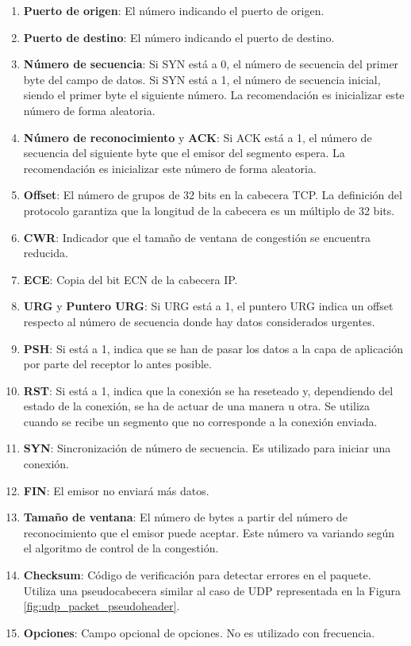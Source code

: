 \begin{enumerate}
    \item \textbf{Puerto de origen}: El número indicando el puerto de origen.
    \item \textbf{Puerto de destino}:  El número indicando el puerto de destino.
    \item \textbf{Número de secuencia}: Si SYN está a 0, el número de secuencia del primer byte del campo de datos. Si SYN está a 1, el número de secuencia inicial, siendo el primer byte el siguiente número. La recomendación es inicializar este número de forma aleatoria.
    \item \textbf{Número de reconocimiento} y \textbf{ACK}: Si ACK está a 1, el número de secuencia del siguiente byte que el emisor del segmento espera.  La recomendación es inicializar este número de forma aleatoria.
    \item \textbf{Offset}: El número de grupos de 32 bits en la cabecera TCP. La definición del protocolo garantiza que la longitud de la cabecera es un múltiplo de 32 bits.
    \item \textbf{CWR}: Indicador que el tamaño de ventana de congestión se encuentra reducida.
    \item \textbf{ECE}: Copia del bit ECN de la cabecera IP.
    \item \textbf{URG} y \textbf{Puntero URG}: Si URG está a 1, el puntero URG indica un offset respecto al número de secuencia donde hay datos considerados urgentes.
    \item \textbf{PSH}: Si está a 1, indica que se han de pasar los datos a la capa de aplicación por parte del receptor lo antes posible.
    \item \textbf{RST}: Si está a 1, indica que la conexión se ha reseteado y, dependiendo del estado de la conexión, se ha de actuar de una manera u otra. Se utiliza cuando se recibe un segmento que no corresponde a la conexión enviada.
    \item \textbf{SYN}: Sincronización de número de secuencia. Es utilizado para iniciar una conexión.
    \item \textbf{FIN}: El emisor no enviará más datos. 
    \item \textbf{Tamaño de ventana}: El número de bytes a partir del número de reconocimiento que el emisor puede aceptar. Este número va variando según el algoritmo de control de la congestión.
    \item \textbf{Checksum}: Código de verificación para detectar errores en el paquete. Utiliza una pseudocabecera similar al caso de UDP representada en la Figura \ref{fig:udp_packet_pseudoheader}.
    \item \textbf{Opciones}: Campo opcional de opciones. No es utilizado con frecuencia.
\end{enumerate}
